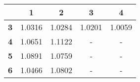 \begin{tabular}{ | c | c | c | c | c | }
\hline
 & {\bf1} & {\bf2} & {\bf3} & {\bf4} \\ \hline
{\bf 3} & 1.0316 & 1.0284 & 1.0201 & 1.0059 \\ \hline
{\bf 4} & 1.0651 & 1.1122 & - & - \\ \hline
{\bf 5} & 1.0891 & 1.0759 & - & - \\ \hline
{\bf 6} & 1.0466 & 1.0802 & - & - \\ \hline
\end{tabular}